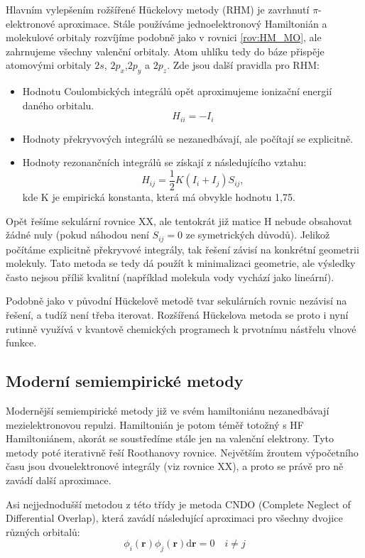 Hlavním vylepšením rožšířené H\"{u}ckelovy metody (RHM) je zavrhnutí $\pi$-elektronové aproximace.
Stále používáme jednoelektronový Hamiltonián a molekulové orbitaly rozvíjíme podobně jako v rovnici \ref{rov:HM_MO}, ale zahrnujeme všechny valenční orbitaly. Atom uhlíku tedy do báze přispěje atomovými orbitaly $2s$, $2p_x$,$2p_y$ a $2p_z$. 
Zde jsou další pravidla pro RHM:

\begin{itemize}
\item Hodnotu Coulombických integrálů opět aproximujeme ionizační energií daného orbitalu.
$$H_{ii}=-I_i$$
\item Hodnoty překryvových integrálů se nezanedbávají, ale počítají se explicitně.
\item Hodnoty rezonančních integrálů se získají z následujícího vztahu:
\begin{equation}
H_{ij}=\frac{1}{2}K(I_i+I_j)S_{ij},
\end{equation}
kde K je empirická konstanta, která má obvykle hodnotu 1,75.
\end{itemize}
Opět řešíme sekulární rovnice XX, ale tentokrát již matice H nebude obsahovat žádné nuly (pokud náhodou není $S_{ij}=0$ ze symetrických důvodů). Jelikož počítáme explicitně překryvové integrály, tak řešení závisí na konkrétní geometrii molekuly. Tato metoda se tedy dá použít k minimalizaci geometrie, ale výsledky často nejsou příliš kvalitní (například molekula vody vychází jako lineární).

Podobně jako v původní H\"{u}ckelově metodě tvar sekulárních rovnic nezávisí na řešení, a tudíž není třeba iterovat. Rozšířená H\"{u}ckelova metoda se proto i nyní rutinně využívá v kvantově chemických programech k prvotnímu nástřelu vlnové funkce.

\subsection{Moderní semiempirické metody}

Modernější semiempirické metody již ve svém hamiltoniánu nezanedbávají mezielektronovou repulzi.
Hamiltonián je potom téměř totožný s HF Hamiltoniánem, akorát se soustředíme stále jen na valenční elektrony. Tyto metody poté iterativně řeší Roothanovy rovnice. Největším žroutem výpočetního času jsou dvouelektronové integrály (viz rovnice XX), a proto se právě pro ně zavádí další aproximace.

Asi nejjednodušší metodou z této třídy je metoda CNDO (Complete Neglect of Differential Overlap), která zavádí následující aproximaci pro všechny dvojice různých orbitalů:
\begin{equation}
\phi_i(\mathbf{r}) \phi_j(\mathbf{r}) \mathrm{d}\mathbf{r} = 0 \quad i\neq j
\end{equation}

